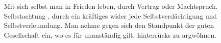 Mit sich selbst  man in Frieden leben, durch Vertrag oder Machtspruch. Selbstachtung , durch ein kräftiges  wider jede Selbstverdächtigung und Selbstverleumdung. Man nehme gegen sich den Standpunkt der guten Gesellschaft ein, wo es für unanständig gilt, hinterrücks zu argwöhnen.
\par

